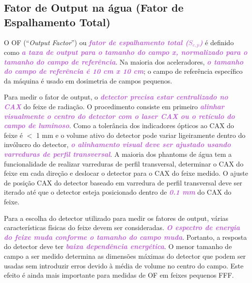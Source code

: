 \documentclass[11pt,a4paper]{article}
\begin{document}
\subsection*{Fator de Output na água (Fator de Espalhamento Total)}

	O OF (``\textit{Output Factor}'') ou \textcolor{MediumOrchid}{\textbf{\textit{fator de espalhamento total ($S_{c,p}$)}}} é definido como \textcolor{MediumOrchid}{\textbf{\textit{a taxa de output para o tamanho do campo x, normalizado para o tamanho do campo de referência}}}. Na maioria dos aceleradores, \textcolor{MediumOrchid}{\textbf{\textit{o tamanho do campo de referência é 10 cm x 10 cm}}}; o campo de referência específico da máquina é usado em dosimetria de campos pequenos.

	Para medir o fator de output, o \textcolor{MediumOrchid}{\textbf{\textit{detector precisa estar centralizado no CAX}}} do feixe de radiação. O procedimento consiste em primeiro \textcolor{MediumOrchid}{\textbf{\textit{alinhar visualmente o centro do detector com o  laser CAX ou o retículo do campo de luminoso}}}. Como a tolerância dos indicadores ópticos  ao CAX do feixe é $<$ 1 mm e o volume ativo do detector pode variar ligeiramente dentro do invólucro do detector, \textcolor{MediumOrchid}{\textbf{\textit{o alinhamento visual deve ser ajustado usando varreduras de perfil transversal}}}. A maioria dos phantoms de água tem a funcionalidade de realizar varreduras de perfil transversal, determinar o CAX do feixe em cada direção e deslocar o detector para o CAX do feixe medido. O ajuste de posição CAX do detector baseado em varredura de perfil transversal deve ser iterado até que o detector esteja posicionado dentro de \textcolor{MediumOrchid}{\textbf{\textit{0.1 mm}}} do CAX do feixe.

	Para a escolha do detector utilizado para medir os fatores de output, várias características físicas do feixe devem ser consideradas. \textcolor{MediumOrchid}{\textbf{\textit{O espectro de energia do feixe muda conforme o tamanho do campo muda}}}. Portanto, a resposta do detector deve ter \textcolor{MediumOrchid}{\textbf{\textit{baixa dependência energética}}}. O menor tamanho de campo a ser medido determina as dimensões máximas do detector que podem ser usadas sem introduzir erros devido à média de volume no centro do campo. Este efeito é ainda mais importante para medidas de OF em feixes pequenos FFF.
\end{document}
